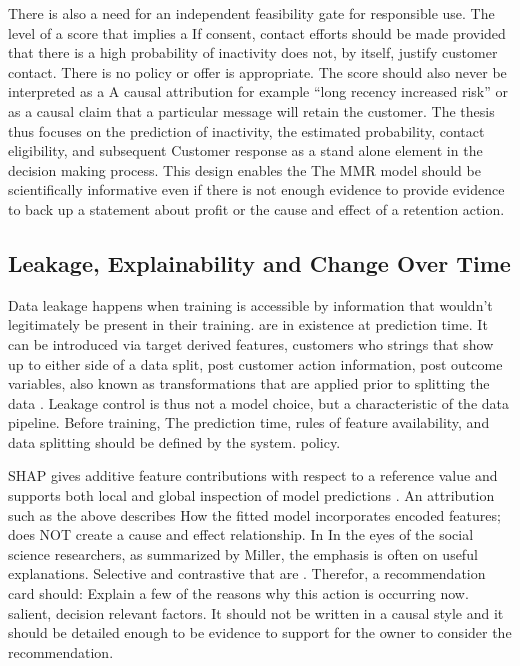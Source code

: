 \documentclass[a4paper,11pt,oneside]{book}
\theoremstyle{plain}
\theoremstyle{definition}
\theoremstyle{remark}
\begin{document}
There is also a need for an independent feasibility gate for responsible use. The level of a score that implies a If consent, contact efforts should be made provided that there is a high probability of inactivity does not, by itself, justify customer contact. There is no policy or offer is appropriate. The score should also never be interpreted as a A causal attribution for example “long recency increased risk” or as a causal claim that a particular message will retain the customer. The thesis thus focuses on the prediction of inactivity, the estimated probability, contact eligibility, and subsequent Customer response as a stand alone element in the decision making process. This design enables the The MMR model should be scientifically informative even if there is not enough evidence to provide evidence to back up a statement about profit or the cause and effect of a retention action.

\subsection{Leakage, Explainability and Change Over Time}

Data leakage happens when training is accessible by information that wouldn't legitimately be present in their training. are in existence at prediction time. It can be introduced via target derived features, customers who strings that show up to either side of a data split, post customer action information, post outcome variables, also known as transformations that are applied prior to splitting the data \cite{kaufman2012leakage}. Leakage control is thus not a model choice, but a characteristic of the data pipeline. Before training, The prediction time, rules of feature availability, and data splitting should be defined by the system. policy.

SHAP gives additive feature contributions with respect to a reference value and supports both local and global inspection of model predictions \cite{lundberg2017shap}. An attribution such as the above describes How the fitted model incorporates encoded features; does NOT create a cause and effect relationship. In In the eyes of the social science researchers, as summarized by Miller, the emphasis is often on useful explanations. Selective and contrastive that are \cite{miller2019explanation}. Therefor, a recommendation card should: Explain a few of the reasons why this action is occurring now. salient, decision relevant factors. It should not be written in a causal style and it should be detailed enough to be evidence to support for the owner to consider the recommendation.
\end{document}
